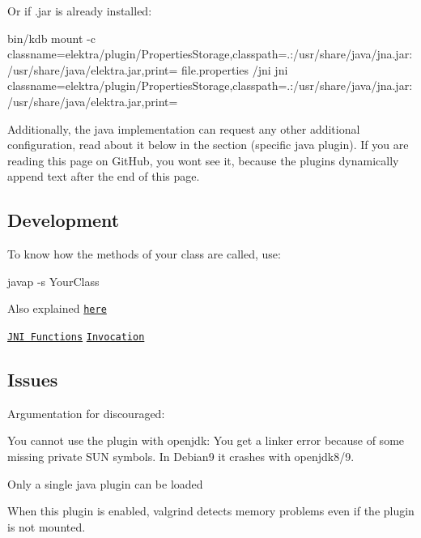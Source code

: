 Or if {\ttfamily .jar} is already installed\+:


\begin{DoxyCode}
bin/kdb mount -c
       classname=elektra/plugin/PropertiesStorage,classpath=.:/usr/share/java/jna.jar:/usr/share/java/elektra.jar,print= file.properties /jni jni
       classname=elektra/plugin/PropertiesStorage,classpath=.:/usr/share/java/jna.jar:/usr/share/java/elektra.jar,print=
\end{DoxyCode}


Additionally, the java implementation can request any other additional configuration, read about it below in the section (specific java plugin). If you are reading this page on Git\+Hub, you won\textquotesingle{}t see it, because the plugins dynamically append text after the end of this page.

\subsection*{Development}

To know how the methods of your class are called, use\+:


\begin{DoxyCode}
javap -s YourClass
\end{DoxyCode}


Also explained \href{https://docs.oracle.com/javase/7/docs/technotes/guides/jni/spec/types.html#wp15773}{\tt here}

\href{https://docs.oracle.com/javase/7/docs/technotes/guides/jni/spec/functions.html}{\tt J\+NI Functions} \href{https://docs.oracle.com/javase/7/docs/technotes/guides/jni/spec/invocation.html}{\tt Invocation}

\subsection*{Issues}

Argumentation for discouraged\+:


\begin{DoxyItemize}
\item You cannot use the plugin with openjdk\+: You get a linker error because of some missing private S\+UN symbols. In Debian9 it crashes with openjdk8/9.
\item Only a single java plugin can be loaded
\item When this plugin is enabled, valgrind detects memory problems even if the plugin is not mounted. 
\end{DoxyItemize}